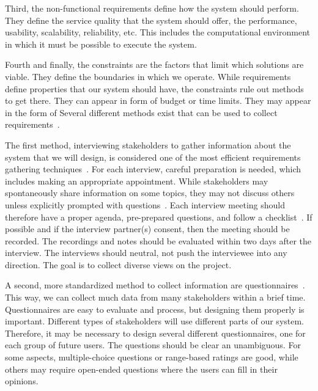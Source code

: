 Third, the non-functional requirements define how the system should perform.
They define the service quality that the system should offer, the performance, usability, scalability, reliability, etc.
This includes the computational environment in which it must be possible to execute the system.

Fourth and finally, the constraints are the factors that limit which solutions are viable.
They define the boundaries in which we operate.
While requirements define properties that our system should have, the constraints rule out methods to get there.
They can appear in form of budget or time limits.
They may appear in the form of %
\endhsection%
%
%
%
Several different methods exist that can be used to collect requirements~\cite{S2003ISA6P:RDARS}.

The first method, interviewing stakeholders to gather information about the system that we will design, is considered one of the most efficient requirements gathering techniques~\cite{DTHJM2006EORETERDFASR,S2003ISA6P:RDARS}.
For each interview, careful preparation is needed, which includes making an appropriate appointment.
While stakeholders may spontaneously share information on some topics, they may not discuss others unless explicitly prompted with questions~\cite{BJF2014WSWOWNSATAESOTIIREEI}.
Each interview meeting should therefore have a proper agenda, pre-prepared questions, and follow a checklist~\cite{WSEG2016ETIOAKOSTCORQQ}.
If possible and if the interview partner(s) consent, then the meeting should be recorded.
The recordings and notes should be evaluated within two days after the interview.
The interviews should neutral, not push the interviewee into any direction.
The goal is to collect diverse views on the project.

A second, more standardized method to collect information are questionnaires~\cite{TAE2008ISRTDQTSTDQSSAE,S2003ISA6P:RDARS}.
This way, we can collect much data from many stakeholders within a brief time.
Questionnaires are easy to evaluate and process, but designing them properly is important.
Different types of stakeholders will use different parts of our system.
Therefore, it may be necessary to design several different questionnaires, one for each group of future users.
The questions should be clear an unambiguous.
For some aspects, multiple-choice questions or range-based ratings are good, while others may require open-ended questions where the users can fill in their opinions.

